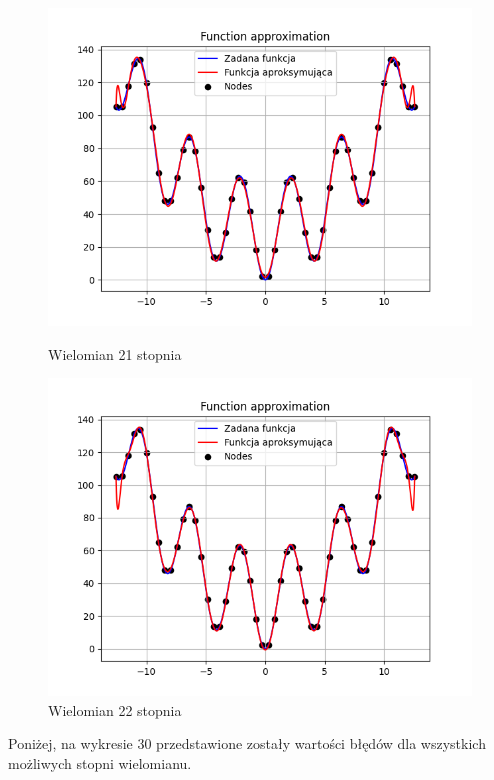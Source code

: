 \documentclass{article}
\begin{document}
\begin{figure}[H]
\begin{minipage}[b]{0.49\textwidth}
    \begin{minipage}[b]{\textwidth}
      \includegraphics[width=\textwidth]{img28.png}
      \caption{Wielomian 21 stopnia}
    \end{minipage}
    \vspace*{\fill}
    \begin{minipage}[b]{\textwidth}
      \includegraphics[width=\textwidth]{img29.png}
      \caption{Wielomian 22 stopnia}
    \end{minipage}
  \end{minipage}
\end{figure}

Poniżej, na wykresie 30 przedstawione zostały wartości błędów dla wszystkich możliwych stopni wielomianu.
\end{document}
